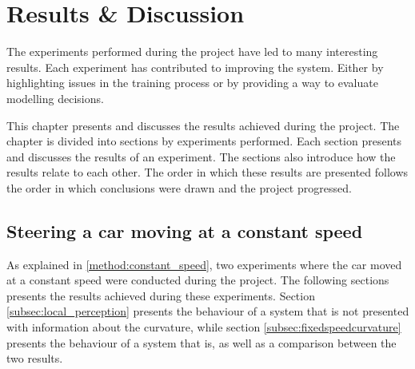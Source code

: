 

\chapter{Results \& Discussion}
The experiments performed during the project have led to many interesting results. Each experiment has contributed to improving the system. Either by highlighting issues in the training process or by providing a way to evaluate modelling decisions. 

This chapter presents and discusses the results achieved during the project. The chapter is divided into sections by experiments performed. Each section presents and discusses the results of an experiment. The sections also introduce how the results relate to each other. The order in which these results are presented follows the order in which conclusions were drawn and the project progressed.

\section{Steering a car moving at a constant speed}

As explained in \ref{method:constant_speed}, two experiments where the car moved at a constant speed were conducted during the project. The following sections presents the results achieved during these experiments. Section \ref{subsec:local_perception} presents the behaviour of a system that is not presented with information about the curvature, while section \ref{subsec:fixedspeedcurvature} presents the behaviour of a system that is, as well as a comparison between the two results.

